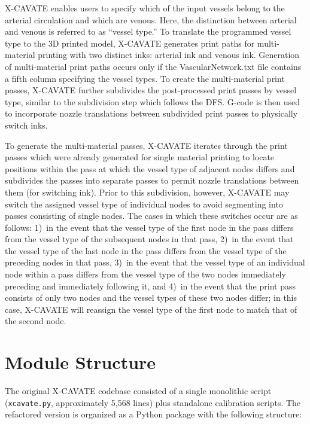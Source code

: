 \documentclass[11pt,letterpaper]{article}
\newcommand{\code}[1]{\texttt{#1}}
\begin{document}
X-CAVATE enables users to specify which of the input vessels belong to the
arterial circulation and which are venous. Here, the distinction between
arterial and venous is referred to as ``vessel type.'' To translate the
programmed vessel type to the 3D printed model, X-CAVATE generates print paths
for multi-material printing with two distinct inks: arterial ink and venous ink.
Generation of multi-material print paths occurs only if the
VascularNetwork.txt file contains a fifth column specifying the vessel types.
To create the multi-material print passes, X-CAVATE further subdivides the
post-processed print passes by vessel type, similar to the subdivision step
which follows the DFS. G-code is then used to incorporate nozzle translations
between subdivided print passes to physically switch inks.

To generate the multi-material passes, X-CAVATE iterates through the print
passes which were already generated for single material printing to locate
positions within the pass at which the vessel type of adjacent nodes differs
and subdivides the passes into separate passes to permit nozzle translations
between them (for switching ink). Prior to this subdivision, however, X-CAVATE
may switch the assigned vessel type of individual nodes to avoid segmenting
into passes consisting of single nodes. The cases in which these switches occur
are as follows: 1)~in the event that the vessel type of the first node in the
pass differs from the vessel type of the subsequent nodes in that pass, 2)~in
the event that the vessel type of the last node in the pass differs from the
vessel type of the preceding nodes in that pass, 3)~in the event that the
vessel type of an individual node within a pass differs from the vessel type of
the two nodes immediately preceding and immediately following it, and 4)~in the
event that the print pass consists of only two nodes and the vessel types of
these two nodes differ; in this case, X-CAVATE will reassign the vessel type of
the first node to match that of the second node.

\section{Module Structure}
\label{sec:module-structure}

\begin{claudebox}
The original X-CAVATE codebase consisted of a single monolithic script
(\code{xcavate.py}, approximately 5,568 lines) plus standalone calibration
scripts. The refactored version is organized as a Python package with the
following structure:
\end{claudebox}
\end{document}
